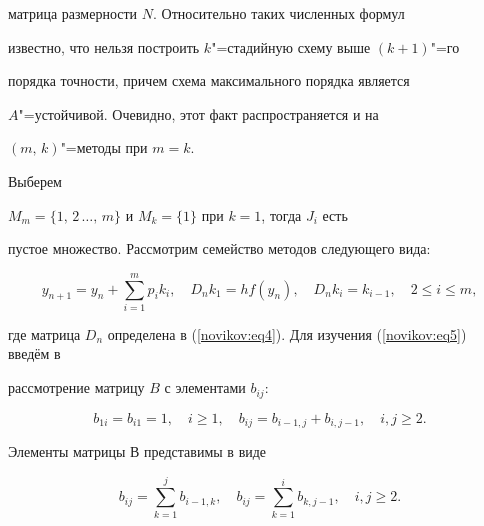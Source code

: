 матрица размерности $N$. Относительно таких численных формул

известно, что нельзя построить $k$"=стадийную схему выше $(k+1)$"=го

порядка точности, причем схема максимального порядка является

$A$"=устойчивой. Очевидно, этот факт распространяется и на

$(m,\,k)$"=методы при $m=k$.



\smallskip



 Выберем

$M_m=\{1,\,2\,\ldots,\, m\}$ и $M_k=\{1\}$ при $k=1$, тогда $J_i$ есть

пустое множество. Рассмотрим семейство методов следующего вида:

\begin{equation}

\label{novikov:eq5}

y_{n+1}=y_n+\sum_{i=1}^mp_ik_i,\quad  D_nk_1=hf(y_n),\quad D_nk_i=k_{i-1}, \quad 2\leq i\leq m,

\end{equation}

где матрица $D_n$  определена в (\ref{novikov:eq4}). Для изучения (\ref{novikov:eq5}) введём в

рассмотрение матрицу $B$ с элементами $b_{ij}$:

\begin{equation}

\label{novikov:eq6}

b_{1i}=b_{i1}=1, \quad i\geq 1,\quad  b_{ij}=b_{i-1,j} +b_{i,j-1}, \quad i, j \geq 2.

\end{equation}



\smallskip



\begin{lemma}[1]

Элементы матрицы В представимы в виде

\begin{equation}

\label{novikov:eq7}

b_{ij}= \sum_{k=1}^jb_{i-1,k}, \quad b_{ij}= \sum_{k=1}^ib_{k,j-1}, \quad i,j \geq 2.

\end{equation}



\end{lemma}



